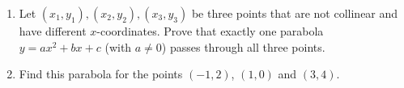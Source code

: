 \begin{enumerate}
\item[(a)] Let $(x_1,y_1),(x_2,y_2),(x_3,y_3)$ be three points that are not collinear and have different $x$-coordinates. Prove that exactly one parabola $y=ax^2+bx+c$ (with $a\ne0$) passes through all three points.
\item[(b)] Find this parabola for the points $(-1,2)$, $(1,0)$ and $(3,4)$.
\end{enumerate}
